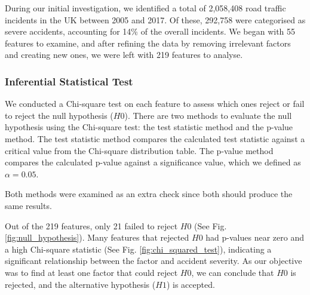 During our initial investigation, we identified a total of 2,058,408 road traffic incidents in the UK between 2005 and 2017.
Of these, 292,758 were categorised as severe accidents, accounting for 14\% of the overall incidents.
We began with 55 features to examine, and after refining the data by removing irrelevant factors and creating new ones, we were left with 219 features to analyse.

\subsubsection{Inferential Statistical Test}

We conducted a Chi-square test on each feature to assess which ones reject or fail to reject the null hypothesis ($H0$).
There are two methods to evaluate the null hypothesis using the Chi-square test: the test statistic method and the p-value method.
The test statistic method compares the calculated test statistic against a critical value from the Chi-square distribution table.
The p-value method compares the calculated p-value against a significance value, which we defined as $\alpha=0.05$.

Both methods were examined as an extra check since both should produce the same results.

Out of the 219 features, only 21 failed to reject $H0$ (See Fig. \ref{fig:null_hypothesis}).
Many features that rejected $H0$ had p-values near zero and a high Chi-square statistic (See Fig. \ref{fig:chi_squared_test}), indicating a significant relationship between the factor and accident severity.
As our objective was to find at least one factor that could reject $H0$, we can conclude that $H0$ is rejected, and the alternative hypothesis ($H1$) is accepted.

